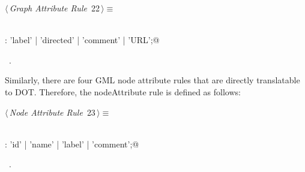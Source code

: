 \documentclass[a4paper]{report}
\begin{document}
\begin{flushleft} \small
\begin{minipage}{\linewidth}\label{scrap22}\raggedright\small
{} $\langle\,${\itshape Graph Attribute Rule}\nobreak\ {\footnotesize {22}}$\,\rangle\equiv$
\vspace{-1ex}
\begin{list}{}{} \item
\mbox{}\verb@@\\
\mbox{}\verb@graphAttribute: 'label' | 'directed' | 'comment' | 'URL';@\\
\mbox{}\verb@@{\NWsep}
\end{list}
\vspace{-1.5ex}
\footnotesize
\begin{list}{}{\setlength{\itemsep}{-\parsep}\setlength{\itemindent}{-\leftmargin}}
\item \NWtxtMacroRefIn\ .

\item{}
\end{list}
\end{minipage}\vspace{4ex}
\end{flushleft}
Similarly, there are four GML node attribute rules that are directly translatable to DOT. Therefore, the nodeAttribute rule is defined as follows:
\begin{flushleft} \small
\begin{minipage}{\linewidth}\label{scrap23}\raggedright\small
{} $\langle\,${\itshape Node Attribute Rule}\nobreak\ {\footnotesize {23}}$\,\rangle\equiv$
\vspace{-1ex}
\begin{list}{}{} \item
\mbox{}\verb@@\\
\mbox{}\verb@nodeAttribute: 'id' | 'name' | 'label' | 'comment';@\\
\mbox{}\verb@@{\NWsep}
\end{list}
\vspace{-1.5ex}
\footnotesize
\begin{list}{}{\setlength{\itemsep}{-\parsep}\setlength{\itemindent}{-\leftmargin}}
\item \NWtxtMacroRefIn\ .

\item{}
\end{list}
\end{minipage}\vspace{4ex}
\end{flushleft}
\end{document}
